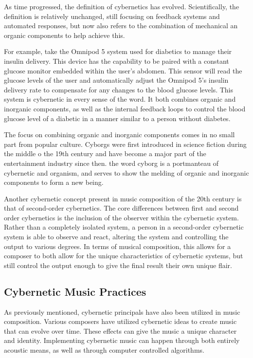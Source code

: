 As time progressed, the definition of cybernetics has evolved. Scientifically, the definition is relatively unchanged, still focusing on feedback systems and automated responses, but now also refers to the combination of mechanical an organic components to help achieve this. %

For example, take the Omnipod 5 system used for diabetics to manage their insulin delivery. This device has the capability to be paired with a constant glucose monitor embedded within the user's abdomen. This sensor will read the glucose levels of the user and automatically adjust the Omnipod 5's insulin delivery rate to compensate for any changes to the blood glucose levels. This system is cybernetic in every sense of the word. It both combines organic and inorganic components, as well as the internal feedback loops to control the blood glucose level of a diabetic in a manner similar to a person without diabetes.

The focus on combining organic and inorganic components comes in no small part from popular culture. Cyborgs were first introduced in science fiction during the middle o the 19th century and have become a major part of the entertainment industry since then. the word cyborg is a portmanteau of cybernetic and organism, and serves to show the melding of organic and inorganic components to form a new being.

Another cybernetic concept present in music composition of the 20th century is that of second-order cybernetics. The core differences between first and second order cybernetics is the inclusion of the observer within the cybernetic system. Rather than a completely isolated system, a person in a second-order cybernetic system is able to observe and react, altering the system and controlling the output to various degrees. In terms of musical composition, this allows for a composer to both allow for the unique characteristics of cybernetic systems, but still control the output enough to give the final result their own unique flair.



\subsection{Cybernetic Music Practices}
As previously mentioned, cybernetic principals have also been utilized in music composition. Various composers have utilized cybernetic ideas to create music that can evolve over time. These effects can give the music a unique character and identity. Implementing cybernetic music can happen through both entirely acoustic means, as well as through computer controlled algorithms.



